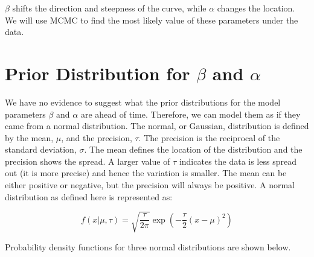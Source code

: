 \documentclass[12pt]{article}
\begin{document}
    \(\beta\) shifts the direction and steepness of the curve, while
\(\alpha\) changes the location. We will use MCMC to find the most
likely value of these parameters under the data.

    \hypertarget{prior-distribution-for-beta-and-alpha}{%
\section{\texorpdfstring{Prior Distribution for \(\beta\) and
\(\alpha\)}{Prior Distribution for \textbackslash{}beta and \textbackslash{}alpha}}\label{prior-distribution-for-beta-and-alpha}}

We have no evidence to suggest what the prior distributions for the
model parameters \(\beta\) and \(\alpha\) are ahead of time. Therefore,
we can model them as if they came from a normal distribution. The
normal, or Gaussian, distribution is defined by the mean, \(\mu\), and
the precision, \(\tau\). The precision is the reciprocal of the standard
deviation, \(\sigma\). The mean defines the location of the distribution
and the precision shows the spread. A larger value of \(\tau\) indicates
the data is less spread out (it is more precise) and hence the variation
is smaller. The mean can be either positive or negative, but the
precision will always be positive. A normal distribution as defined here
is represented as:

\[ f(x | \mu, \tau) = \sqrt{\frac{\tau}{2\pi}} \exp\left( -\frac{\tau}{2} (x - \mu)^2 \right) \]

Probability density functions for three normal distributions are shown
below.
\end{document}
